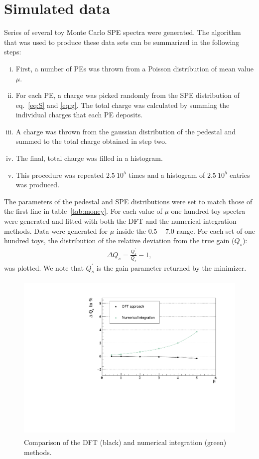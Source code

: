 \documentclass[a4paper,11pt]{article}
\begin{document}
\section{Simulated data}
\label{sec:mc}

Series of several toy Monte Carlo SPE spectra were generated. 
The algorithm that was used to produce these data sets can be summarized in the following steps:
\begin{enumerate}[i.]
\item First, a number of PEs was thrown from a Poisson distribution of mean value $\mu$.
\item For each PE, a charge was picked randomly from the SPE distribution of eq.~\eqref{eq:S} and \eqref{eq:g}. 
The total charge was calculated by summing the individual charges that each PE deposits. 
\item A charge was thrown from the gaussian distribution of the pedestal and summed to the total charge obtained in step two. 
\item The final, total charge was filled in a histogram.  
\item This procedure was repeated $2.5\  10^5$ times and a histogram of $2.5\  10^5$ entries was produced. 
\end{enumerate}
The parameters of the pedestal and SPE distributions were set to match those of the first line in table~\ref{tab:money}. 
For each value of $\mu$ one hundred toy spectra were generated and fitted with both the DFT and the numerical integration methods. 
Data were generated for $\mu$ inside the 0.5 -- 7.0 range. For each set of one hundred toys, the distribution of the relative deviation from the true gain ($Q_s$):
\begin{align}
\Delta Q_s = \frac{Q_s^\prime}{Q_s} - 1,
\end{align}  
was plotted. We note that $Q_s^\prime$ is the gain parameter returned by the minimizer. 

\begin{figure}[!t]
\centering
\includegraphics[width=11.5cm, height=8.2cm]{figures/comp.pdf} 
\caption{Comparison of the DFT (black) and numerical integration (green) methods. }
\label{fig:comp}
\end{figure}
\end{document}
